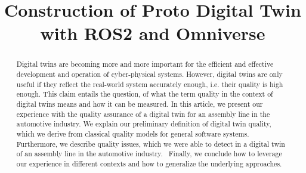 \documentclass[conference]{IEEEtran}
\begin{document}
    \title{Construction of Proto Digital Twin with ROS2 and Omniverse}
    \author{ 
    \and 
    }
   
    \maketitle

    \begin{abstract}
        Digital twins are becoming more and more important for the efficient and effective development and operation of cyber-physical systems.
        However, digital twins are only useful if they reflect the real-world system accurately enough, i.e. their quality is high enough. 
        This claim entails the question, of what the term quality in the context of digital twins means and how it can be measured. 
        In this article, we present our experience with the quality assurance of a digital twin for an assembly line in the automotive industry.
        We explain our preliminary definition of digital twin quality, which we derive from classical quality models for general software systems. 
        Furthermore, we describe quality issues, which we were able to detect in a digital twin of an assembly line in the automotive industry. \
        Finally, we conclude how to leverage our experience in different contexts and how to generalize the underlying approaches.
    \end{abstract}
\end{document}
